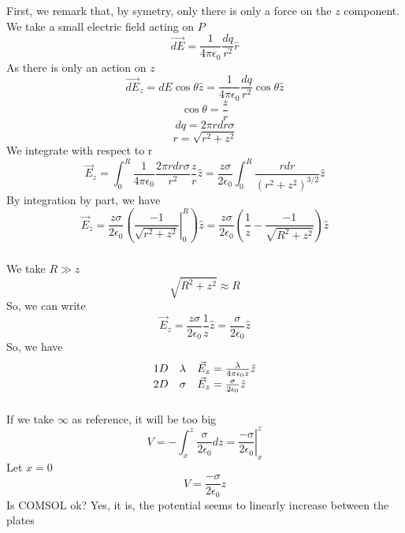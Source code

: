 \subsubsection{}
First, we remark that, by symetry, only there is only a force on the \(z\)
component.
We take a small electric field acting on \(P\)
\[
	\vec{dE} = \frac{1}{4 \pi \epsilon_0} \frac{dq}{r^2} \hat{r}
\]
As there is only an action on \(z\)
\[
	\vec{dE}_z = dE \cos{\theta} \hat{z}
	= \frac{1}{4 \pi \epsilon_0} \frac{dq}{r^2} \cos{\theta} \hat{z}
\]
\[
	\cos{\theta} = \frac{z}{r}
\]
\[
	dq = 2 \pi r dr \sigma
\]
\[
	r = \sqrt{r^2+z^2}
\]
We integrate with respect to r
\[
	\vec{E}_z = \int_0^R \frac{1}{4 \pi \epsilon_0}
		\frac{2 \pi r dr \sigma}{r^2} \frac{z}{r} \hat{z}
	= \frac{z \sigma}{2 \epsilon_0}
	\int_0^R \frac{r dr}{(r^2 + z^2)^{3/2}} \hat{z}
\]
By integration by part, we have
\[
	\vec{E}_z = \frac{z \sigma}{2 \epsilon_0}
	( \left. \frac{-1}{\sqrt{r^2+z^2}} \right |_0^R ) \hat{z}
	= \frac{z \sigma}{2 \epsilon_0}
		( \frac{1}{z} - \frac{-1}{\sqrt{R^2+z^2}} ) \hat{z}
\]

\subsubsection{}

We take \(R \gg z\)
\[
	\sqrt{R^2 + z^2} \approx R
\]
So, we can write
\[
	\vec{E}_z = \frac{z \sigma}{2 \epsilon_0} \frac{1}{z} \hat{z}
	= \frac{\sigma}{2 \epsilon_0} \hat{z}
\]
So, we have
\[
	\begin{array}{l l l}
		1D & \lambda &
		\vec{E}_z = \frac{\lambda}{4 \pi \epsilon_0 z} \hat{z} \\
		2D & \sigma  &
		\vec{E}_z = \frac{\sigma}{2 \epsilon_0} \hat{z}
	\end{array}
\]

\subsubsection{}

If we take \(\infty\) as reference, it will be too big
\[
	V = - \int_{x}^z \frac{\sigma}{2 \epsilon_0} dz
	= \left. \frac{- \sigma}{2 \epsilon_0} \right|_x^z
\]
Let \(x = 0\)
\[
	V = \frac{- \sigma}{2 \epsilon_0} z
\]
Is COMSOL ok? Yes, it is, the potential seems to linearly increase between the
plates

\subsubsection{}


